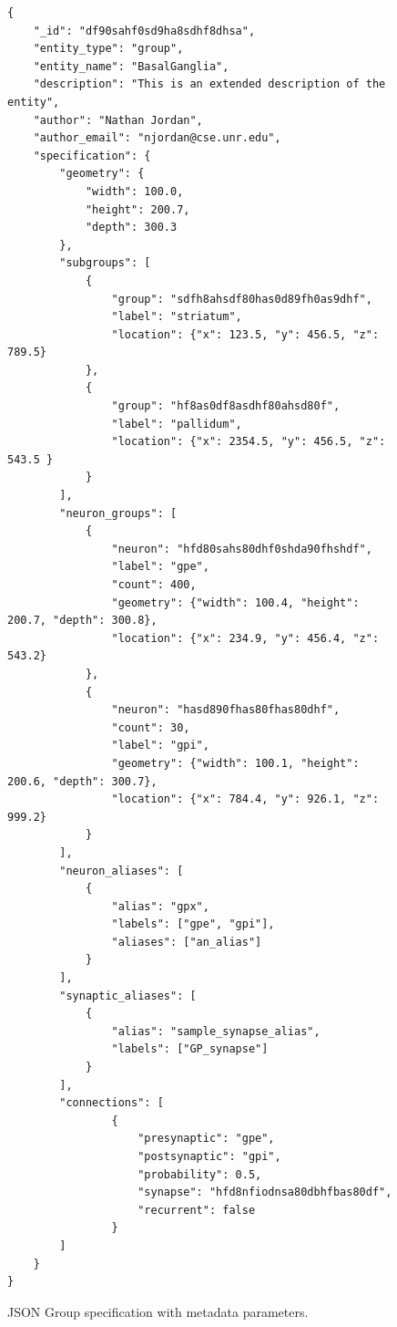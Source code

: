 \begin{figure}
\begin{center}
\begin{lstlisting}
{
    "_id": "df90sahf0sd9ha8sdhf8dhsa",
    "entity_type": "group",
    "entity_name": "BasalGanglia",
    "description": "This is an extended description of the entity",
    "author": "Nathan Jordan",
    "author_email": "njordan@cse.unr.edu",
    "specification": {
        "geometry": {
            "width": 100.0,
            "height": 200.7,
            "depth": 300.3
        },
        "subgroups": [
            {
                "group": "sdfh8ahsdf80has0d89fh0as9dhf",
                "label": "striatum",
                "location": {"x": 123.5, "y": 456.5, "z": 789.5}
            },
            {
                "group": "hf8as0df8asdhf80ahsd80f",
                "label": "pallidum",
                "location": {"x": 2354.5, "y": 456.5, "z": 543.5 }
            }
        ],
        "neuron_groups": [
            {
                "neuron": "hfd80sahs80dhf0shda90fhshdf",
                "label": "gpe",
                "count": 400,
                "geometry": {"width": 100.4, "height": 200.7, "depth": 300.8},
                "location": {"x": 234.9, "y": 456.4, "z": 543.2}
            },
            {
                "neuron": "hasd890fhas80fhas80dhf",
                "count": 30,
                "label": "gpi",
                "geometry": {"width": 100.1, "height": 200.6, "depth": 300.7},
                "location": {"x": 784.4, "y": 926.1, "z": 999.2}
            }
        ],
        "neuron_aliases": [
            {
                "alias": "gpx",
                "labels": ["gpe", "gpi"],
                "aliases": ["an_alias"]
            }
        ],
        "synaptic_aliases": [
            {
                "alias": "sample_synapse_alias",
                "labels": ["GP_synapse"]
            }
        ],
        "connections": [
                {
                    "presynaptic": "gpe",
                    "postsynaptic": "gpi",
                    "probability": 0.5,
                    "synapse": "hfd8nfiodnsa80dbhfbas80df",
                    "recurrent": false
                }
        ]
    }
}
\end{lstlisting}
\caption[JSON Group Definition]{JSON Group specification with metadata parameters.\label{fig:group_json}}
\end{center}
\end{figure}

\lstset{
  basicstyle=\footnotesize\ttfamily
}


